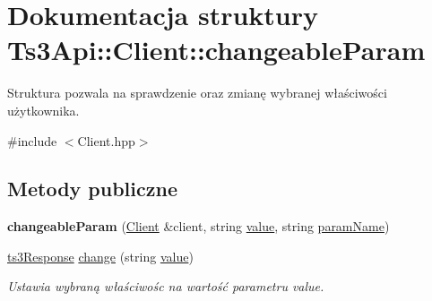 \hypertarget{struct_ts3_api_1_1_client_1_1changeable_param}{}\section{Dokumentacja struktury Ts3\+Api\+:\+:Client\+:\+:changeable\+Param}
\label{struct_ts3_api_1_1_client_1_1changeable_param}


Struktura pozwala na sprawdzenie oraz zmianę wybranej właściwości użytkownika.  




{\ttfamily \#include $<$Client.\+hpp$>$}

\subsection*{Metody publiczne}
\begin{DoxyCompactItemize}
\item 
{\bfseries changeable\+Param} (\hyperlink{class_ts3_api_1_1_client}{Client} \&client, string \hyperlink{struct_ts3_api_1_1_client_1_1changeable_param_a4e3b8780f19688a682dc08e3e15912a3}{value}, string \hyperlink{struct_ts3_api_1_1_client_1_1changeable_param_a8fd9d911c39159e0139a7309d0d99e38}{param\+Name})\hypertarget{struct_ts3_api_1_1_client_1_1changeable_param_a1e378b376136300d1420542efc1e7e5d}{}\label{struct_ts3_api_1_1_client_1_1changeable_param_a1e378b376136300d1420542efc1e7e5d}

\item 
\hyperlink{struct_ts3_api_1_1ts3_response}{ts3\+Response} \hyperlink{struct_ts3_api_1_1_client_1_1changeable_param_ac3f3dd298ba1d2c0d5db342217c891af}{change} (string \hyperlink{struct_ts3_api_1_1_client_1_1changeable_param_a4e3b8780f19688a682dc08e3e15912a3}{value})
\begin{DoxyCompactList}\small\item\em Ustawia wybraną właściwośc na wartość parametru value. \end{DoxyCompactList}\end{DoxyCompactItemize}
